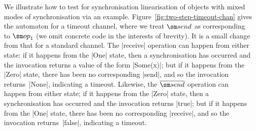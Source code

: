 We illustrate how to test for synchronisation linearisation of objects with
mixed modes of synchronisation via an example.
%
Figure~\ref{fig:two-step-timeout-chan} gives the automaton for a timeout
channel, where we treat $\send$ as corresponding to $\op_1$ (we omit concrete
code in the interests of brevity).  It is a small
change from that for a standard channel.  The |receive| operation can happen
from either state: if it happens from the |One| state, then a synchronisation
has occurred and the invocation returns a value of the form |Some(x)|; but if
it happens from the |Zero| state, there has been no corresponding |send|, and
so the invocation returns~|None|, indicating a timeout.  Likewise, the
$\overline{\send}$ operation can happen from either state; if it happens from
the |Zero| state, then a synchronisation has occurred and the invocation
returns |true|; but if it happens from the |One| state, there has been no
corresponding |receive|, and so the invocation returns~|false|, indicating a
timeout.



%

